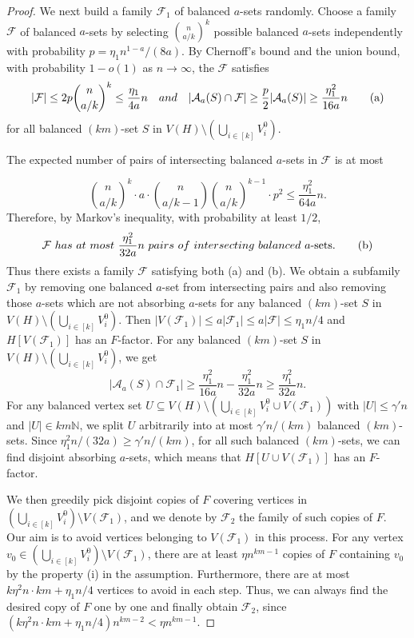 \documentclass[11pt,a4paper]{article}
\theoremstyle{definition}
\begin{document}
\begin{proof}
    We next build a family $\mathcal{F}_1$ of balanced $a$-sets randomly. Choose a family $\mathcal{F}$ of balanced $a$-sets by selecting $\binom{n}{a/k}^k$ possible balanced $a$-sets independently with probability $p=\eta_1n^{1-a}/(8a)$. By Chernoff's bound and the union bound, with probability $1-o(1)$ as $n\rightarrow \infty$, the $\mathcal{F}$ satisfies
    \begin{equation}
        |\mathcal{F}|\leq 2p\binom{n}{a/k}^k\leq \frac{\eta_1}{4a}n\quad {\rm and}\quad |\mathcal{A}_a(S)\cap \mathcal{F}|\geq \frac{p}{2}|\mathcal{A}_a(S)|\geq \frac{\eta_1^2}{16a}n \tag{a}
    \end{equation}
    for all balanced $(km)$-set $S$ in $V(H)\setminus (\bigcup_{i\in [k]}V_i^0)$.

    The expected number of pairs of intersecting balanced $a$-sets in $\mathcal{F}$ is at most
    
    $$    \binom{n}{a/k}^k\cdot a \cdot \binom{n}{a/k-1}\binom{n}{a/k}^{k-1}\cdot p^2\leq \frac{\eta_1^2}{64a}n.$$
    Therefore, by Markov's inequality, with probability at least $1/2$, 
    \begin{equation}
        \mathcal{F}\ {\rm has}\ {\rm at}\ {\rm most}\ \frac{\eta_1^2}{32a}n\ {\rm pairs}\ {\rm of}\ {\rm intersecting}\ {\rm balanced}\ a{\text {-sets}}.\tag{b}
    \end{equation}
 Thus there exists a family $\mathcal{F}$ satisfying both (a) and (b). We obtain a subfamily $\mathcal{F}_1$ by removing one balanced $a$-set from intersecting pairs and also removing those $a$-sets which are not absorbing $a$-sets for any balanced $(km)$-set $S$ in $V(H)\setminus (\bigcup_{i\in [k]}V_i^0)$. Then $|V(\mathcal{F}_1)|\leq a|\mathcal{F}_1|\leq a|\mathcal{F}|\leq \eta_1n/4$ and $H[V(\mathcal{F}_1)]$ has an $F$-factor. For any balanced $(km)$-set $S$ in $V(H)\setminus (\bigcup_{i\in [k]}V_i^0)$, we get
 $$|\mathcal{A}_a(S)\cap \mathcal{F}_1|\geq \frac{\eta_1^2}{16a}n-\frac{\eta_1^2}{32a}n\geq \frac{\eta_1^2}{32a}n.$$
 For any balanced vertex set $U \subseteq V (H)\setminus (\bigcup_{i\in [k]}V_i^0\cup V(\mathcal{F}_1))$ with $|U| \leq \gamma' n$ and $|U| \in km\mathbb{N}$, we split $U$ arbitrarily into at most $\gamma'n/(km)$ balanced $(km)$-sets. Since $\eta_1^2n/(32a)\geq \gamma'n/(km)$, for all such balanced $(km)$-sets, we can find disjoint absorbing $a$-sets, which means that $H[U\cup V(\mathcal{F}_1)]$ has an $F$-factor.

 We then greedily pick disjoint copies of $F$ covering vertices in $(\bigcup_{i\in [k]}V_i^0)\setminus V(\mathcal{F}_1)$,  and we denote by $\mathcal{F}_2$ the family of such copies of $F$. Our aim is to avoid vertices belonging to $V(\mathcal{F}_1)$ in this process. For any vertex $v_0\in (\bigcup_{i\in [k]}V_i^0)\setminus V(\mathcal{F}_1)$, there are at least $\eta n^{km-1}$ copies of $F$ containing $v_0$ by the property (i) in the assumption. Furthermore, there are at most $k\eta^2n\cdot km+\eta_1n/4$ vertices to avoid in each step. Thus, we can always find the desired copy of $F$ one by one and finally obtain $\mathcal{F}_2$, since $(k\eta^2n\cdot km+\eta_1n/4)n^{km-2}< \eta n^{km-1}$.


\end{proof}
\end{document}
